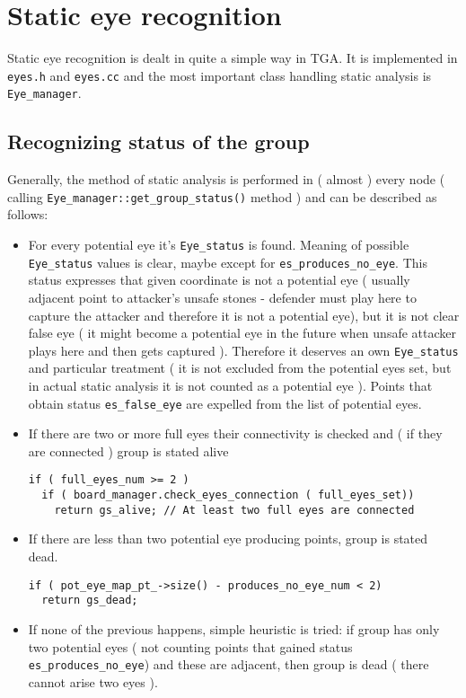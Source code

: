 \section{Static eye recognition}\label{page_4}
Static eye recognition is dealt in quite a simple way in TGA. It is implemented in {\tt eyes.h} and {\tt eyes.cc} and the most important class handling static analysis is {\tt Eye\_\-manager}. \subsection{Recognizing status of the group}\label{page_4_page_4__sec_1}
Generally, the method of static analysis is performed in ( almost ) every node ( calling {\tt Eye\_\-manager::get\_\-group\_\-status()} method ) and can be described as follows:\begin{itemize}
\item For every potential eye it's {\tt Eye\_\-status} is found. Meaning of possible {\tt Eye\_\-status} values is clear, maybe except for {\tt es\_\-produces\_\-no\_\-eye}. This status expresses that given coordinate is not a potential eye ( usually adjacent point to attacker's unsafe stones - defender must play here to capture the attacker and therefore it is not a potential eye), but it is not clear false eye ( it might become a potential eye in the future when unsafe attacker plays here and then gets captured ). Therefore it deserves an own {\tt Eye\_\-status} and particular treatment ( it is not excluded from the potential eyes set, but in actual static analysis it is not counted as a potential eye ). Points that obtain status {\tt es\_\-false\_\-eye} are expelled from the list of potential eyes.\item If there are two or more full eyes their connectivity is checked and ( if they are connected ) group is stated alive 

\footnotesize\begin{verbatim}if ( full_eyes_num >= 2 ) 
  if ( board_manager.check_eyes_connection ( full_eyes_set))
    return gs_alive; // At least two full eyes are connected
\end{verbatim}
\normalsize
\item If there are less than two potential eye producing points, group is stated dead. 

\footnotesize\begin{verbatim}if ( pot_eye_map_pt_->size() - produces_no_eye_num < 2)  
  return gs_dead;
\end{verbatim}
\normalsize
\item If none of the previous happens, simple heuristic is tried: if group has only two potential eyes ( not counting points that gained status {\tt es\_\-produces\_\-no\_\-eye}) and these are adjacent, then group is dead ( there cannot arise two eyes ). 


\end{itemize}

